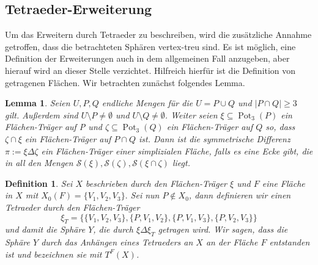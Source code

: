 \documentclass[12pt,titlepage,twoside,cleardoublepage]{article}
\theoremstyle{nummermitklammern}
\newtheorem{lemma}[temp]{Lemma}
\newtheorem{definition}[temp]{Definition}
\newtheorem{definition}[zahl]{Definition}
\newtheorem{lemma}[zahl]{Lemma}
\numberwithin{equation}{section}
\DeclareMathOperator{\Pot}{Pot}
\begin{document}
  \subsection{Tetraeder-Erweiterung}
 Um das Erweitern durch Tetraeder zu beschreiben, wird die zusätzliche Annahme getroffen, dass die betrachteten Sphären vertex-treu sind. Es ist möglich, eine Definition der Erweiterungen auch in dem allgemeinen Fall anzugeben, aber hierauf wird an dieser Stelle verzichtet.
 Hilfreich hierfür ist die Definition von getragenen Flächen. Wir betrachten zunächst folgendes Lemma.
\begin{lemma}
Seien $U,P,Q$ endliche Mengen für die $U=P\cup Q$ und $\vert P\cap Q \vert \geq 3$ gilt. Außerdem sind $U\setminus P\neq \emptyset$ und $U\setminus Q \neq \emptyset$. Weiter seien $\xi \subseteq \Pot_3(P)$ ein Flächen-Träger auf P und $\zeta \subseteq \Pot_3(Q)$ ein Flächen-Träger auf $Q$ so, dass $\zeta \cap \xi$ ein Flächen-Träger auf $P \cap Q$ ist. Dann ist die symmetrische Differenz $\pi :=\xi \Delta \zeta$ ein Flächen-Träger einer simplizialen Fläche, falls es eine Ecke gibt, die in all den Mengen $\mathcal{S}(\xi),\mathcal{S}(\zeta),\mathcal{S}(\xi\cap\zeta)$ liegt. 
\end{lemma}

\begin{definition}
Sei $X$ beschrieben durch den Flächen-Träger $\xi$ und $F$ eine Fläche in $X$ mit $X_0(F)=\{V_1,V_2,V_3\}.$ Sei nun $P\notin X_0$, dann definieren wir einen Tetraeder durch den Flächen-Träger
\[
\xi_T=\{\{V_1,V_2,V_3\},\{P,V_1,V_2\},\{P,V_1,V_3\},\{P,V_2,V_3\}\}
\] 
und damit die Sphäre $Y$, die durch $\xi \Delta \xi_T$ getragen wird. Wir sagen, dass die Sphäre $Y$ durch das Anhängen eines Tetraeders an $X$ an der Fläche $F$ entstanden ist und bezeichnen sie mit $T^F(X)$.
\end{definition}
\end{document}
